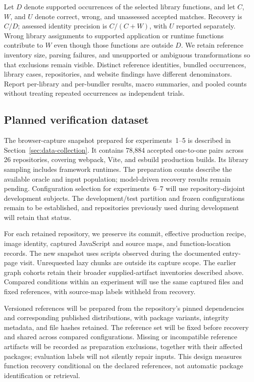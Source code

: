 Let $D$ denote supported occurrences of the selected library functions, and let $C$, $W$, and $U$ denote correct, wrong, and unassessed accepted matches. Recovery is $C/D$; assessed identity precision is $C/(C+W)$, with $U$ reported separately. Wrong library assignments to supported application or runtime functions contribute to $W$ even though those functions are outside $D$. We retain reference inventory size, parsing failures, and unsupported or ambiguous transformations so that exclusions remain visible. Distinct reference identities, bundled occurrences, library cases, repositories, and website findings have different denominators. Report per-library and per-bundler results, macro summaries, and pooled counts without treating repeated occurrences as independent trials.

\subsection{Planned verification dataset}
\label{sec:planned-verification}
The browser-capture snapshot prepared for experiments~1--5 is described in Section~\ref{sec:data-collection}. It contains 78,884 accepted one-to-one pairs across 26 repositories, covering webpack, Vite, and esbuild production builds. Its library sampling includes framework runtimes. The preparation counts describe the available oracle and input population; model-driven recovery results remain pending. Configuration selection for experiments~6--7 will use repository-disjoint development subjects. The development/test partition and frozen configurations remain to be established, and repositories previously used during development will retain that status.

For each retained repository, we preserve its commit, effective production recipe, image identity, captured JavaScript and source maps, and function-location records. The new snapshot uses scripts observed during the documented entry-page visit. Unrequested lazy chunks are outside its capture scope. The earlier graph cohorts retain their broader supplied-artifact inventories described above. Compared conditions within an experiment will use the same captured files and fixed references, with source-map labels withheld from recovery.

Versioned references will be prepared from the repository's pinned dependencies and corresponding published distributions, with package variants, integrity metadata, and file hashes retained. The reference set will be fixed before recovery and shared across compared configurations. Missing or incompatible reference artifacts will be recorded as preparation exclusions, together with their affected packages; evaluation labels will not silently repair inputs. This design measures function recovery conditional on the declared references, not automatic package identification or retrieval.

